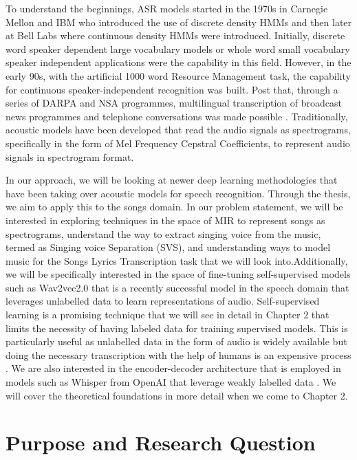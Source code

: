 To understand the beginnings, ASR models started in the 1970s in Carnegie Mellon and IBM who introduced the use of discrete density HMMs and then later at Bell Labs where continuous density HMMs were introduced. Initially, discrete word speaker dependent large vocabulary models or whole word small vocabulary speaker independent applications were the capability in this field. However, in the early 90s, with the artificial 1000 word Resource Management task, the capability for continuous speaker-independent recognition was built. Post that, through a series of DARPA and NSA programmes, multilingual transcription of broadcast news programmes and telephone conversations was made possible \cite{gales2008application}. Traditionally, acoustic models have been developed that read the audio signals as spectrograms, specifically in the form of Mel Frequency Cepstral Coefficients, to represent audio signals in spectrogram format. 

In our approach, we will be looking at newer deep learning methodologies that have been taking over acoustic models for speech recognition. Through the thesis, we aim to apply this to the songs domain. In our problem statement, we will be interested in exploring techniques in the space of MIR to represent songs as spectrograms, understand the way to extract singing voice from the music, termed as Singing voice Separation (SVS), and understanding ways to model music for the Songs Lyrics Transcription task that we will look into.Additionally, we will be specifically interested in the space of fine-tuning self-supervised models such as Wav2vec2.0 that is a recently successful model in the speech domain that leverages unlabelled data to learn representations of audio. Self-supervised learning is a promising technique that we will see in detail in Chapter 2 that limits the necessity of having labeled data for training supervised models. This is particularly useful as unlabelled data in the form of audio is widely available but doing the necessary transcription with the help of humans is an expensive process \cite{baevski2020wav2vec}. We are also interested in the encoder-decoder architecture that is employed in models such as Whisper from OpenAI that leverage weakly labelled data \cite{radford2023robust}. We will cover the theoretical foundations in more detail when we come to Chapter 2.



\section{Purpose and Research Question}%
\label{sec:purpose}

